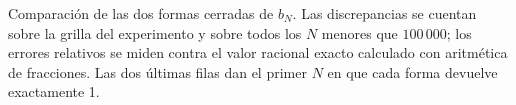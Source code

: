 \begin{table}[htbp]
  \centering
  \caption{Comparación de las dos formas cerradas de $b_N$. Las discrepancias se cuentan sobre la
  grilla del experimento y sobre todos los $N$ menores que $100\,000$; los errores relativos se
  miden contra el valor racional exacto calculado con aritmética de fracciones. Las dos últimas
  filas dan el primer $N$ en que cada forma devuelve exactamente 1.}
  \label{tab:exp3-cerradas}
  
\end{table}
